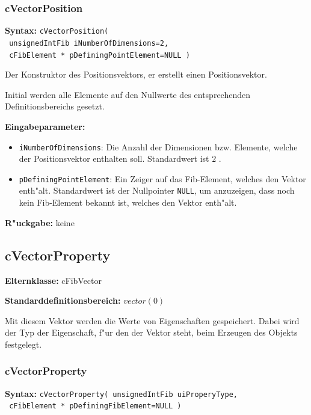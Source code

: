 \subsubsection{cVectorPosition}

\textbf{Syntax:} \verb|cVectorPosition(| \\\verb| unsignedIntFib iNumberOfDimensions=2,| \\\verb| cFibElement * pDefiningPointElement=NULL )|

\bigskip\noindent
Der Konstruktor des Positionsvektors, er erstellt einen Positionsvektor.

Initial werden alle Elemente auf den Nullwerte des entsprechenden Definitionsbereichs gesetzt.

\bigskip\noindent
\textbf{Eingabeparameter:}
\begin{itemize}
 \item \verb|iNumberOfDimensions|: Die Anzahl der Dimensionen bzw. Elemente, welche der Positionsvektor enthalten soll. Standardwert ist $2$ .
 \item \verb|pDefiningPointElement|: Ein Zeiger auf das Fib-Element, welches den Vektor enth"alt. Standardwert ist der Nullpointer \verb|NULL|, um anzuzeigen, dass noch kein Fib-Element bekannt ist, welches den Vektor enth"alt.
\end{itemize}

\bigskip\noindent
\textbf{R"uckgabe:} keine


\subsection{cVectorProperty}

\bigskip\noindent
\textbf{Elternklasse:} cFibVector

\bigskip\noindent
\textbf{Standarddefinitionsbereich:}  $vector( 0 )$

\bigskip\noindent
Mit diesem Vektor werden die Werte von Eigenschaften gespeichert. Dabei wird der Typ der Eigenschaft, f"ur den der Vektor steht, beim Erzeugen des Objekts festgelegt.


\subsubsection{cVectorProperty}

\textbf{Syntax:} \verb|cVectorProperty( unsignedIntFib uiProperyType,| \\\verb| cFibElement * pDefiningFibElement=NULL )|

